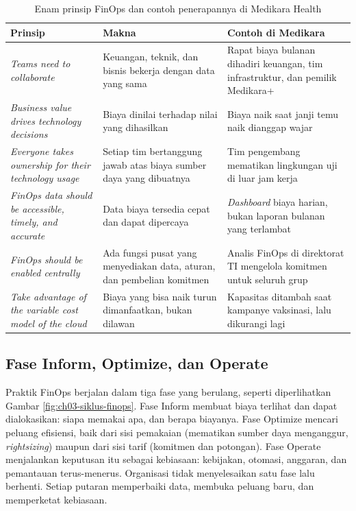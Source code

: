 \begin{table}[!htb]
  \centering
  \caption{Enam prinsip FinOps dan contoh penerapannya di Medikara Health}
  \label{tab:ch03-prinsip-finops}
  \footnotesize
  \begin{tabularx}{\textwidth}{>{\raggedright\arraybackslash}p{3.1cm} >{\raggedright\arraybackslash}X >{\raggedright\arraybackslash}X}
    \hline
    \textbf{Prinsip} & \textbf{Makna} & \textbf{Contoh di Medikara} \\ \hline
    \textit{Teams need to collaborate} & Keuangan, teknik, dan bisnis bekerja dengan data yang sama
      & Rapat biaya bulanan dihadiri keuangan, tim infrastruktur, dan pemilik Medikara+ \\ \hline
    \textit{Business value drives technology decisions} & Biaya dinilai terhadap nilai yang
      dihasilkan & Biaya naik saat janji temu naik dianggap wajar \\ \hline
    \textit{Everyone takes ownership for their technology usage} & Setiap tim bertanggung jawab atas
      biaya sumber daya yang dibuatnya & Tim pengembang mematikan lingkungan uji di luar jam kerja
      \\ \hline
    \textit{FinOps data should be accessible, timely, and accurate} & Data biaya tersedia cepat dan
      dapat dipercaya & \textit{Dashboard} biaya harian, bukan laporan bulanan yang terlambat \\
      \hline
    \textit{FinOps should be enabled centrally} & Ada fungsi pusat yang menyediakan data, aturan,
      dan pembelian komitmen & Analis FinOps di direktorat TI mengelola komitmen untuk seluruh grup
      \\ \hline
    \textit{Take advantage of the variable cost model of the cloud} & Biaya yang bisa naik turun
      dimanfaatkan, bukan dilawan & Kapasitas ditambah saat kampanye vaksinasi, lalu dikurangi lagi
      \\ \hline
  \end{tabularx}
\end{table}

\subsection{Fase Inform, Optimize, dan Operate}

Praktik FinOps berjalan dalam tiga fase yang berulang, seperti diperlihatkan Gambar
\ref{fig:ch03-siklus-finops}. Fase Inform membuat biaya terlihat dan dapat dialokasikan: siapa
memakai apa, dan berapa biayanya. Fase Optimize mencari peluang efisiensi, baik dari sisi pemakaian
(mematikan sumber daya menganggur, \textit{rightsizing}) maupun dari sisi tarif (komitmen dan
potongan). Fase Operate menjalankan keputusan itu sebagai kebiasaan: kebijakan, otomasi, anggaran,
dan pemantauan terus-menerus. Organisasi tidak menyelesaikan satu fase lalu berhenti. Setiap putaran
memperbaiki data, membuka peluang baru, dan memperketat kebiasaan.


